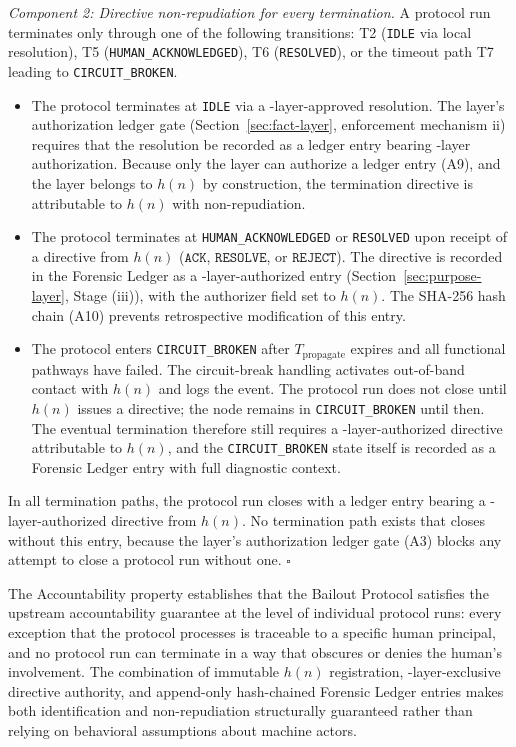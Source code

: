 \medskip
\noindent
\textit{Component 2: Directive non-repudiation for every termination.} A protocol run terminates only through one of the following transitions: T2 (\texttt{IDLE} via local resolution), T5 (\texttt{HUMAN\_ACKNOWLEDGED}), T6 (\texttt{RESOLVED}), or the timeout path T7 leading to \texttt{CIRCUIT\_BROKEN}. 

\begin{itemize}\itemsep=0pt
\item[T2:] The protocol terminates at \texttt{IDLE} via a \fact-layer-approved resolution. The \fact{} layer's authorization ledger gate (Section~\ref{sec:fact-layer}, enforcement mechanism ii) requires that the resolution be recorded as a ledger entry bearing \purpose{}-layer authorization. Because only the \purpose{} layer can authorize a ledger entry (A9), and the \purpose{} layer belongs to $h(n)$ by construction, the termination directive is attributable to $h(n)$ with non-repudiation.

\item[T5/T6:] The protocol terminates at \texttt{HUMAN\_ACKNOWLEDGED} or \texttt{RESOLVED} upon receipt of a directive from $h(n)$ ($\texttt{ACK}$, $\texttt{RESOLVE}$, or $\texttt{REJECT}$). The directive is recorded in the Forensic Ledger as a \purpose-layer-authorized entry (Section~\ref{sec:purpose-layer}, Stage (iii)), with the authorizer field set to $h(n)$. The SHA-256 hash chain (A10) prevents retrospective modification of this entry.

\item[T7:] The protocol enters \texttt{CIRCUIT\_BROKEN} after $T_{\text{propagate}}$ expires and all functional pathways have failed. The circuit-break handling activates out-of-band contact with $h(n)$ and logs the event. The protocol run does not close until $h(n)$ issues a directive; the node remains in \texttt{CIRCUIT\_BROKEN} until then. The eventual termination therefore still requires a \purpose-layer-authorized directive attributable to $h(n)$, and the \texttt{CIRCUIT\_BROKEN} state itself is recorded as a Forensic Ledger entry with full diagnostic context.
\end{itemize}

In all termination paths, the protocol run closes with a ledger entry bearing a \purpose-layer-authorized directive from $h(n)$. No termination path exists that closes without this entry, because the \fact{} layer's authorization ledger gate (A3) blocks any attempt to close a protocol run without one. $\square$

\medskip
The Accountability property establishes that the Bailout Protocol satisfies the upstream accountability guarantee at the level of individual protocol runs: every exception that the protocol processes is traceable to a specific human principal, and no protocol run can terminate in a way that obscures or denies the human's involvement. The combination of immutable $h(n)$ registration, \purpose{}-layer-exclusive directive authority, and append-only hash-chained Forensic Ledger entries makes both identification and non-repudiation structurally guaranteed rather than relying on behavioral assumptions about machine actors.

